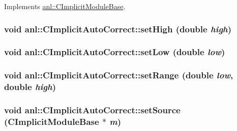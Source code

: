 Implements \hyperlink{classanl_1_1CImplicitModuleBase_ab88f8a1822dcfbc13ba5230318b0acd1}{anl::CImplicitModuleBase}.\hypertarget{classanl_1_1CImplicitAutoCorrect_a1274d40ccdce37d6c9f35df7e4a8f46d}{
\subsubsection[{setHigh}]{\setlength{\rightskip}{0pt plus 5cm}void anl::CImplicitAutoCorrect::setHigh (double {\em high})}}
\label{classanl_1_1CImplicitAutoCorrect_a1274d40ccdce37d6c9f35df7e4a8f46d}
\hypertarget{classanl_1_1CImplicitAutoCorrect_a152d8d74e2ffcd19c75d867ac86a42b0}{
\subsubsection[{setLow}]{\setlength{\rightskip}{0pt plus 5cm}void anl::CImplicitAutoCorrect::setLow (double {\em low})}}
\label{classanl_1_1CImplicitAutoCorrect_a152d8d74e2ffcd19c75d867ac86a42b0}
\hypertarget{classanl_1_1CImplicitAutoCorrect_adc8bde0b07be66e0605c9e48a294ee39}{
\subsubsection[{setRange}]{\setlength{\rightskip}{0pt plus 5cm}void anl::CImplicitAutoCorrect::setRange (double {\em low}, \/  double {\em high})}}
\label{classanl_1_1CImplicitAutoCorrect_adc8bde0b07be66e0605c9e48a294ee39}
\hypertarget{classanl_1_1CImplicitAutoCorrect_a9cd0fef48a82f446482240484d66fbb7}{
\subsubsection[{setSource}]{\setlength{\rightskip}{0pt plus 5cm}void anl::CImplicitAutoCorrect::setSource ({\bf CImplicitModuleBase} $\ast$ {\em m})}}
\label{classanl_1_1CImplicitAutoCorrect_a9cd0fef48a82f446482240484d66fbb7}


